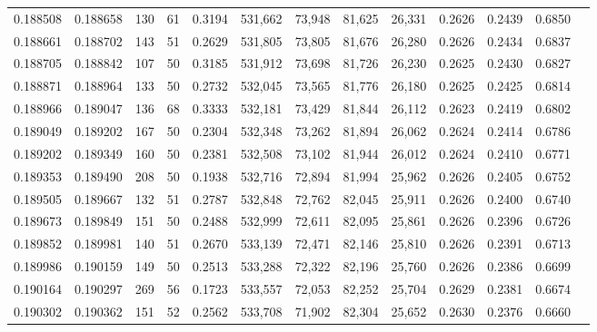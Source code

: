 \begin{tabular}{rrrrrrrrrrrrr}
0.188508 & 0.188658 &   130 &  61 &                                     0.3194 & 531,662 &  73,948 &  81,625 &  26,331 & 0.2626 & 0.2439 & 0.6850 \\
0.188661 & 0.188702 &   143 &  51 &                                     0.2629 & 531,805 &  73,805 &  81,676 &  26,280 & 0.2626 & 0.2434 & 0.6837 \\
0.188705 & 0.188842 &   107 &  50 &                                     0.3185 & 531,912 &  73,698 &  81,726 &  26,230 & 0.2625 & 0.2430 & 0.6827 \\
0.188871 & 0.188964 &   133 &  50 &                                     0.2732 & 532,045 &  73,565 &  81,776 &  26,180 & 0.2625 & 0.2425 & 0.6814 \\
0.188966 & 0.189047 &   136 &  68 &                                     0.3333 & 532,181 &  73,429 &  81,844 &  26,112 & 0.2623 & 0.2419 & 0.6802 \\
0.189049 & 0.189202 &   167 &  50 &                                     0.2304 & 532,348 &  73,262 &  81,894 &  26,062 & 0.2624 & 0.2414 & 0.6786 \\
0.189202 & 0.189349 &   160 &  50 &                                     0.2381 & 532,508 &  73,102 &  81,944 &  26,012 & 0.2624 & 0.2410 & 0.6771 \\
0.189353 & 0.189490 &   208 &  50 &                                     0.1938 & 532,716 &  72,894 &  81,994 &  25,962 & 0.2626 & 0.2405 & 0.6752 \\
0.189505 & 0.189667 &   132 &  51 &                                     0.2787 & 532,848 &  72,762 &  82,045 &  25,911 & 0.2626 & 0.2400 & 0.6740 \\
0.189673 & 0.189849 &   151 &  50 &                                     0.2488 & 532,999 &  72,611 &  82,095 &  25,861 & 0.2626 & 0.2396 & 0.6726 \\
0.189852 & 0.189981 &   140 &  51 &                                     0.2670 & 533,139 &  72,471 &  82,146 &  25,810 & 0.2626 & 0.2391 & 0.6713 \\
0.189986 & 0.190159 &   149 &  50 &                                     0.2513 & 533,288 &  72,322 &  82,196 &  25,760 & 0.2626 & 0.2386 & 0.6699 \\
0.190164 & 0.190297 &   269 &  56 &                                     0.1723 & 533,557 &  72,053 &  82,252 &  25,704 & 0.2629 & 0.2381 & 0.6674 \\
0.190302 & 0.190362 &   151 &  52 &                                     0.2562 & 533,708 &  71,902 &  82,304 &  25,652 & 0.2630 & 0.2376 & 0.6660 \\

\end{tabular}

